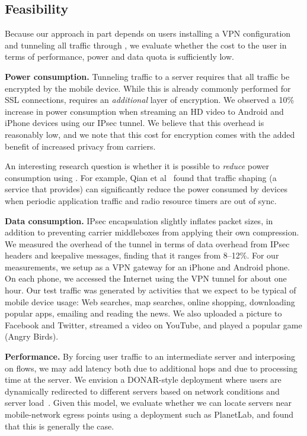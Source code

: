 \subsection{Feasibility}
\label{subsec:cost}
Because our approach in part depends on users installing a VPN configuration and tunneling all traffic through \meddle, we evaluate whether the cost to the user in terms of performance, power and data quota is sufficiently low.

\noindent\textbf{Power consumption.} Tunneling traffic to a \meddle
server requires that all traffic be encrypted by the mobile
device. While this is already commonly performed for SSL connections,
\meddle requires an \emph{additional} layer of encryption. We observed
a 10\% increase in power consumption when streaming an HD video to
Android and iPhone devices using our IPsec tunnel. We believe that this 
overhead is reasonably low, and we note that this cost for encryption comes with the added benefit of increased 
privacy from carriers.

An interesting research question is whether it is possible to \emph{reduce} power consumption using \meddle. For example, Qian et al~\cite{qian:rrc,qian:aro,qian:periodic} found that traffic shaping (a service that \meddle provides) can significantly reduce the power consumed by devices when periodic application traffic and radio resource timers are out of sync.

  
\noindent\textbf{Data consumption.} IPsec encapsulation slightly inflates packet sizes, in addition to
preventing carrier middleboxes from applying their own compression. We
measured the overhead of the tunnel in terms of data overhead from IPsec 
headers and keepalive
messages, finding that it ranges from 8--12\%. For our measurements, we setup \meddle
as a VPN gateway for an iPhone and Android phone. On each phone,
we accessed the Internet using the VPN tunnel for about one hour. Our
test traffic was generated by activities that we expect to be typical of mobile 
device usage: Web searches, map searches, online shopping, 
downloading popular apps, emailing and reading the news. We also uploaded a picture to 
Facebook and Twitter, streamed a video on YouTube, and played a popular game (Angry Birds). 

\noindent\textbf{Performance.} By forcing user traffic to an
intermediate server and interposing on flows, we may add latency both
due to additional hops and due to processing time at the \meddle
server. We envision a DONAR-style deployment where users are
dynamically redirected to different \meddle servers based on network
conditions and server load~\cite{wendell:donar}. Given this model, we
evaluate whether we can locate servers near mobile-network egress
points using a deployment such as PlanetLab, and found that this is
generally the case.


